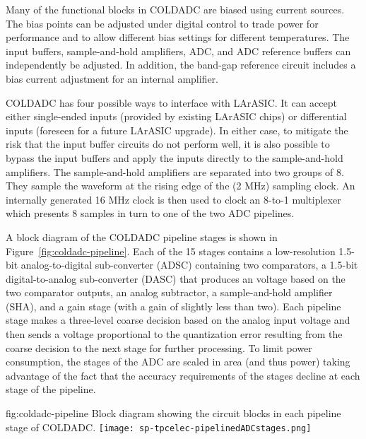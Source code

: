 Many of the functional blocks in COLDADC are biased using current sources.  The bias points can be adjusted under digital control to trade power for performance and to allow different bias settings for different temperatures.  The input buffers, sample-and-hold amplifiers, ADC, and ADC reference buffers can independently be adjusted.  In addition, the band-gap reference circuit includes a bias current adjustment for an internal amplifier.

COLDADC has four possible ways to interface with LArASIC.  It can accept either single-ended inputs (provided by existing LArASIC chips) or differential inputs (foreseen for a future LArASIC upgrade).  In either case, to mitigate the risk that the input buffer circuits do not perform well, it is also possible to bypass the input buffers and apply the inputs directly to the sample-and-hold amplifiers.  The sample-and-hold amplifiers are separated into two groups of 8.  They sample the waveform at the rising edge of the (2 MHz) sampling clock.  An internally generated 16 MHz clock is then used to clock an 8-to-1 multiplexer which presents 8 samples in turn to one of the two ADC pipelines.

A block diagram of the COLDADC pipeline stages is shown in Figure~\ref{fig:coldadc-pipeline}.  Each of the 15 stages contains a low-resolution 1.5-bit analog-to-digital sub-converter (ADSC) containing two comparators, a 1.5-bit digital-to-analog sub-converter (DASC) that produces an voltage based on the two comparator outputs, an analog subtractor, a sample-and-hold amplifier (SHA), and a gain stage (with a gain of slightly less than two).  Each pipeline stage makes a three-level coarse decision based on the analog input voltage and then sends a voltage proportional to the quantization error resulting from the coarse decision to the next stage for further processing.  To limit power consumption, the stages of the ADC are scaled in area (and thus power) taking advantage of the fact that the accuracy requirements of the stages decline at each stage of the pipeline.

\begin{dunefigure}
{fig:coldadc-pipeline}
{Block diagram showing the circuit blocks in each pipeline stage of COLDADC.}
\texttt{[image: sp-tpcelec-pipelinedADCstages.png]}
\end{dunefigure}


